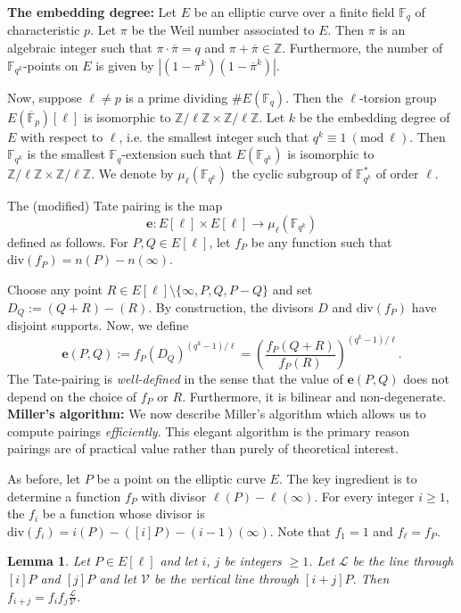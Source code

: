 \documentclass[11pt, lettersize, notitlepage, leqno, footskip=0.6cm]{article}
\newcommand{\bF}{\mathbb F}
\newcommand{\bz}{\mathbb Z}
\newcommand{\bFP}{\ov{\mathbb{F}}_p}
\newcommand{\bFq}{\mathbb{F}_q}
\newcommand{\bFqk}{\mathbb{F}_{q^k}}
\newcommand{\divv}{\mathrm{div}}
\newcommand{\lra}{\longrightarrow}
\newcommand{\mc}{\mathcal}
\newcommand{\e}{\mathbf{e}}
\newcommand{\ov}{\overline}
\newcommand{\vs}{\vspace{-0.15cm}}
\newcommand{\noin}{\noindent}
\newcommand{\Mod}[1]{\ (\mathrm{mod}\ #1)}
\newtheorem{Lem}[Thm]{Lemma}
\numberwithin{equation}{section}
\begin{document}
\noin \textbf{The embedding degree:} Let $E$ be an elliptic curve over a finite field $\bFq$  of characteristic $p$. Let $\pi$ be the Weil number associated to $E$. Then $\pi$ is an algebraic integer such that $\pi\cdot \ov{\pi} = q$ and $\pi+\ov{\pi}\in \bz$. Furthermore, the number of $\bFqk$-points on $E$ is given by $|(1-\pi^k)(1-\ov{\pi}^k)|$.


Now, suppose $\ell\neq p$ is a prime dividing $\# E(\bFq)$. Then the $\ell$-torsion group $E(\bFP)[\ell]$ is isomorphic to $\bz/\ell\bz \times \bz/\ell\bz$. Let $k$ be the embedding degree of $E$ with respect to $\ell$, i.e. the smallest integer such that $q^k\equiv 1\Mod{\ell}$. Then $\bF _{q^k}$ is the smallest $\bFq$-extension such that $E(\bF _{q^k})$ is isomorphic to $\bz/\ell\bz \times \bz/\ell\bz$. We denote by $\mu_{\ell}(\bF _{q^k})$ the cyclic subgroup of $\bF _{q^k}^*$ of order $\ell$.

The (modified) Tate pairing is the map \vs $$\e: E[\ell]\times E[\ell] \lra \mu_{\ell}(\bF _{q^k})$$ defined as follows. For $P,Q \in E[\ell]$, let $f_P$ be any function such that $\divv(f_P) = n(P) - n(\infty)$.

Choose any point $R\in E[\ell]\setminus \{\infty, P, Q, P-Q \}$ and set $D_Q:= (Q+R)-(R)$. By construction, the divisors $D$ and $\divv(f_P)$ have disjoint supports. Now, we define \vs $$\e(P,Q):= f_P(D_Q)^{(q^k-1)/\ell} = \left( \frac{f_P(Q+R)}{f_P(R)}  \right)^ {(q^k-1)/\ell}.$$ The Tate-pairing is \textit{well-defined} in the sense that the value of $\e(P,Q)$ does not depend on the choice of $f_P$ or $R$. Furthermore, it is bilinear and non-degenerate.\\


\noin \textbf{Miller's algorithm:} We now describe Miller's algorithm which allows us to compute pairings \textit{efficiently}. This elegant algorithm is the primary reason pairings are of practical value rather than purely of theoretical interest. 

As before, let $P$ be a point on the elliptic curve $E$. The key ingredient is to determine a function $f_P$ with divisor $\ell(P)-\ell(\infty)$. For every integer $i\geq 1$, the $f_i$ be a function whose divisor is $\divv(f_i) = i(P)	- ([i]P) - (i-1)(\infty)$. Note that $f_1 = 1$ and $f_{\ell} = f_{P}$.


\begin{Lem} Let $P\in E[\ell]$ and let $i$, $j$ be integers $\geq 1$. Let $\mc{L}$ be the line through $[i]P$ and $[j]P$ and let $\mc{V}$ be the vertical line through $[i+j]P$. Then $f_{i+j} = f_{i}f_{j}\frac{\mc{L}}{\mc{V}}$.\end{Lem}
\end{document}
